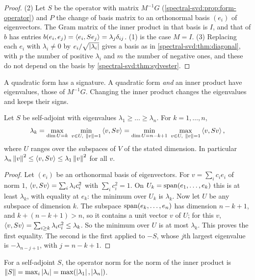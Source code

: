 \begin{notechapter}
\begin{proof}
(2) Let $S$ be the operator with matrix $M^{-1}G$
(\cref{spectral-svd:prop:form-operator}) and $P$ the change of basis
matrix to an orthonormal basis $(e_i)$ of eigenvectors. The Gram matrix of
the inner product in that basis is $I$, and that of $b$ has entries
$b(e_i, e_j) = \left\langle e_i, Se_j \right\rangle = \lambda_j\delta_{ij}$. (1) is the case
$M = I$. (3) Replacing each $e_i$ with $\lambda_i\neq0$ by
$e_i/\sqrt{\left|\lambda_i\right|}$ gives a basis as in
\cref{spectral-svd:thm:diagonal}, with $p$ the number of positive
$\lambda_i$ and $m$ the number of negative ones, and these do not depend
on the basis by \cref{spectral-svd:thm:sylvester}.
\end{proof}

\begin{keyidea}
A quadratic form has a signature. A quadratic form \emph{and} an inner
product have eigenvalues, those of $M^{-1}G$. Changing the inner product
changes the eigenvalues and keeps their signs.
\end{keyidea}

\begin{theorem}\label{spectral-svd:thm:minmax}
Let $S$ be self-adjoint with eigenvalues
$\lambda_1\geq\dots\geq\lambda_n$. For $k = 1,\dots,n$,
\[
  \lambda_k = \max_{\dim U = k}\ \min_{v\in U,\ \left\|v\right\| = 1}\left\langle v, Sv \right\rangle
  = \min_{\dim U = n - k + 1}\ \max_{v\in U,\ \left\|v\right\| = 1}\left\langle v, Sv \right\rangle ,
\]
where $U$ ranges over the subspaces of $V$ of the stated dimension. In
particular $\lambda_n\left\|v\right\|^2\leq\left\langle v, Sv \right\rangle\leq\lambda_1\left\|v\right\|^2$ for
all $v$.
\end{theorem}

\begin{proof}
Let $(e_i)$ be an orthonormal basis of eigenvectors. For
$v = \sum_ic_ie_i$ of norm $1$, $\left\langle v, Sv \right\rangle = \sum_i\lambda_ic_i^2$ with
$\sum_ic_i^2 = 1$. On $U_k = \operatorname{span}(e_1,\dots,e_k)$ this is at least
$\lambda_k$, with equality at $e_k$: the minimum over $U_k$ is
$\lambda_k$. Now let $U$ be any subspace of dimension $k$. The subspace
$\operatorname{span}(e_k,\dots,e_n)$ has dimension $n - k + 1$, and
$k + (n - k + 1) > n$, so it contains a unit vector $v$ of $U$; for this
$v$, $\left\langle v, Sv \right\rangle = \sum_{i\geq k}\lambda_ic_i^2\leq\lambda_k$. So the
minimum over $U$ is at most $\lambda_k$. This proves the first equality.
The second is the first applied to $-S$, whose $j$th largest eigenvalue is
$-\lambda_{n-j+1}$, with $j = n - k + 1$.
\end{proof}

\begin{corollary}
\label{spectral-svd:cor:norm}
For a self-adjoint $S$, the operator norm for the norm of the inner
product is $\left\|S\right\| = \max_i\left|\lambda_i\right|
= \max(\left|\lambda_1\right|, \left|\lambda_n\right|)$.
\end{corollary}


\end{notechapter}
